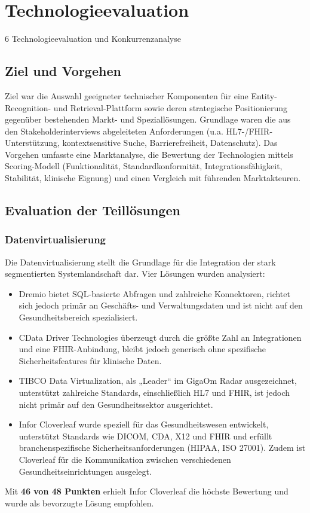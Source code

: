 {\let\clearpage\relax
\chapter{Technologieevaluation}}
\label{sec:technologieevaluation}
6 Technologieevaluation und Konkurrenzanalyse
\section{Ziel und Vorgehen}
Ziel war die Auswahl geeigneter technischer Komponenten für eine Entity-Recognition- und Retrieval-Plattform sowie deren strategische Positionierung gegenüber bestehenden Markt- und Speziallösungen. Grundlage waren die aus den Stakeholderinterviews abgeleiteten Anforderungen (u.a. HL7-/FHIR-Unterstützung, kontextsensitive Suche, Barrierefreiheit, Datenschutz).
Das Vorgehen umfasste eine Marktanalyse, die Bewertung der Technologien mittels Scoring-Modell (Funktionalität, Standardkonformität, Integrationsfähigkeit, Stabilität, klinische Eignung) und einen Vergleich mit führenden Marktakteuren.
\section{Evaluation der Teillösungen}
\subsection{Datenvirtualisierung}
Die Datenvirtualisierung stellt die Grundlage für die Integration der stark segmentierten Systemlandschaft dar. Vier Lösungen wurden analysiert:
\begin{itemize}
	\item Dremio bietet SQL-basierte Abfragen und zahlreiche Konnektoren, richtet sich jedoch primär an Geschäfts- und Verwaltungsdaten und ist nicht auf den Gesundheitsbereich spezialisiert.
	\item CData Driver Technologies überzeugt durch die größte Zahl an Integrationen und eine FHIR-Anbindung, bleibt jedoch generisch ohne spezifische Sicherheitsfeatures für klinische Daten.
	\item TIBCO Data Virtualization, als „Leader“ im GigaOm Radar ausgezeichnet, unterstützt zahlreiche Standards, einschließlich HL7 und FHIR, ist jedoch nicht primär auf den Gesundheitssektor ausgerichtet.
	\item Infor Cloverleaf wurde speziell für das Gesundheitswesen entwickelt, unterstützt Standards wie DICOM, CDA, X12 und FHIR und erfüllt branchenspezifische Sicherheitsanforderungen (HIPAA, ISO 27001). Zudem ist Cloverleaf für die Kommunikation zwischen verschiedenen Gesundheitseinrichtungen ausgelegt.
\end{itemize}
Mit \textbf{46 von 48 Punkten} erhielt Infor Cloverleaf die höchste Bewertung und wurde als bevorzugte Lösung empfohlen.

